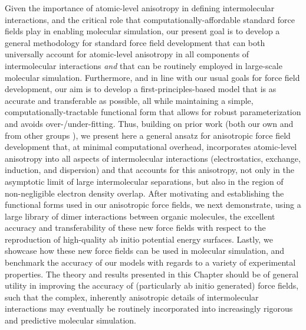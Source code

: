 Given the
importance of atomic-level anisotropy in defining intermolecular
interactions,
and the critical role that computationally-affordable standard force
fields play in enabling molecular simulation, our present goal is to
develop a general methodology for standard
force field development that can both universally account for atomic-level anisotropy in all
components of intermolecular interactions \emph{and} that can be routinely
employed in large-scale molecular simulation. 
Furthermore, and in line with our usual goals for force field
development,\cite{Schmidt2015}
our aim is to develop a first-principles-based model that is as accurate and transferable as possible, all while
maintaining a simple, computationally-tractable functional form that allows
for robust parameterization and avoids over-/under-fitting.
Thus, building on prior work (both our own
\cite{VanVleet2016,Schmidt2015,Misquitta2014,Stone2007} 
and from other groups
\cite{Price2000}),
we present here a general ansatz for anisotropic force field development
that, at minimal computational overhead, incorporates atomic-level anisotropy
into all aspects of intermolecular interactions (electrostatics,
exchange, induction, and dispersion) and that accounts for this anisotropy,
not only in the asymptotic limit of large intermolecular separations, 
but also in the region of non-negligible electron density
overlap.
After motivating and establishing the
functional forms used in our anisotropic force fields, we next demonstrate,
using a large library of dimer interactions between organic
molecules, the excellent accuracy and transferability of these new force
fields with respect to the reproduction of high-quality ab initio potential
energy surfaces. Lastly, we showcase how these new force fields can be used
in molecular simulation, and benchmark the
accuracy of our models with regards to a variety of experimental properties. 
The theory and results presented in this Chapter should be
of general utility in improving the accuracy of (particularly ab initio
generated) force fields, such that the complex, inherently anisotropic details of
intermolecular interactions may eventually be routinely incorporated into
increasingly rigorous and predictive molecular simulation.
